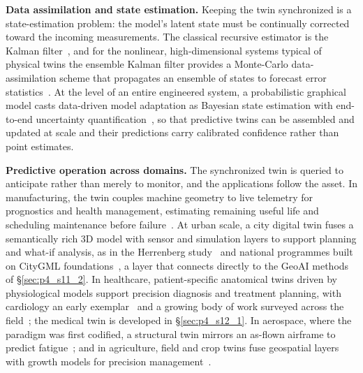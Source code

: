 \textbf{Data assimilation and state estimation.} Keeping the twin synchronized is a state-estimation problem: the model's latent state must be continually corrected toward the incoming measurements.
The classical recursive estimator is the Kalman filter~\cite{kalman1960new}, and for the nonlinear, high-dimensional systems typical of physical twins the ensemble Kalman filter provides a Monte-Carlo data-assimilation scheme that propagates an ensemble of states to forecast error statistics~\cite{evensen1994sequential}.
At the level of an entire engineered system, a probabilistic graphical model casts data-driven model adaptation as Bayesian state estimation with end-to-end uncertainty quantification~\cite{kapteyn2021probabilistic}, so that predictive twins can be assembled and updated at scale and their predictions carry calibrated confidence rather than point estimates.

\textbf{Predictive operation across domains.} The synchronized twin is queried to anticipate rather than merely to monitor, and the applications follow the asset.
In manufacturing, the twin couples machine geometry to live telemetry for prognostics and health management, estimating remaining useful life and scheduling maintenance before failure~\cite{tao2018digital}. At urban scale, a city digital twin fuses a semantically rich 3D model with sensor and simulation layers to support planning and what-if analysis, as in the Herrenberg study~\cite{dembski2020urban} and national programmes built on CityGML foundations~\cite{soon2017citygml}, a layer that connects directly to the GeoAI methods of §\ref{sec:p4_s11_2}.
In healthcare, patient-specific anatomical twins driven by physiological models support precision diagnosis and treatment planning, with cardiology an early exemplar~\cite{corralacero2020digital} and a growing body of work surveyed across the field~\cite{katsoulakis2024digital}; the medical twin is developed in §\ref{sec:p4_s12_1}.
In aerospace, where the paradigm was first codified, a structural twin mirrors an as-flown airframe to predict fatigue~\cite{glaessgen2012digital}; and in agriculture, field and crop twins fuse geospatial layers with growth models for precision management~\cite{verdouw2021digital}.

